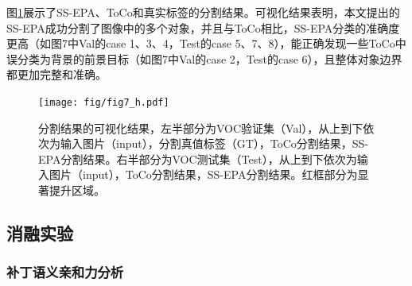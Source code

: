 图\ref{fig7}展示了SS-EPA、ToCo和真实标签的分割结果。可视化结果表明，本文提出的SS-EPA成功分割了图像中的多个对象，并且与ToCo相比，SS-EPA分类的准确度更高（如图7中Val的case 1、3、4，Test的case 5、7、8），能正确发现一些ToCo中误分类为背景的前景目标（如图7中Val的case 2，Test的case 6），且整体对象边界都更加完整和准确。

\begin{figure}[htbp]
    \centerline{\texttt{[image: fig/fig7\_h.pdf]}}
    \begin{CJK*}{UTF8}{fs}
        \caption{分割结果的可视化结果，左半部分为VOC验证集（Val），从上到下依次为输入图片（input），分割真值标签（GT），ToCo分割结果，SS-EPA分割结果。右半部分为VOC测试集（Test），从上到下依次为输入图片（input），ToCo分割结果，SS-EPA分割结果。红框部分为显著提升区域。}\label{fig7}
    \end{CJK*}
\end{figure}


\vspace{2mm}

\begin{CJK*}{UTF8}{zhhei}
    \subsection{消融实验}
\end{CJK*}



\begin{CJK*}{UTF8}{zhhei}
    \subsubsection{补丁语义亲和力分析}
\end{CJK*}

